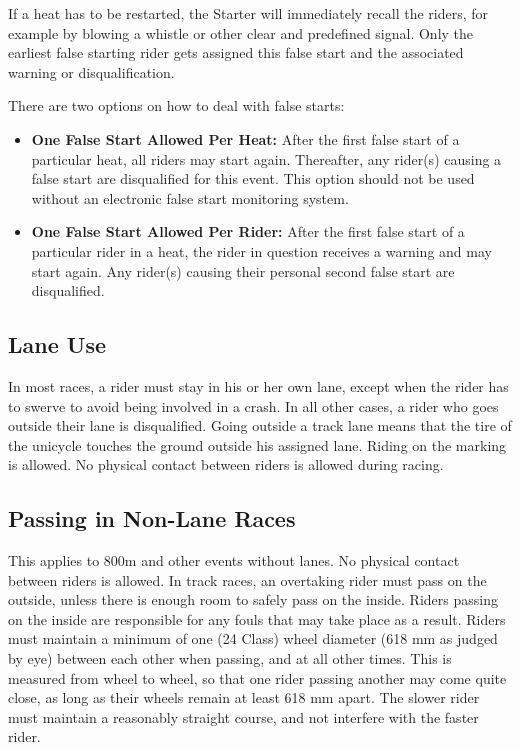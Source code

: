 If a heat has to be restarted, the Starter will immediately recall the riders, for example by blowing a whistle or other clear and predefined signal.
Only the earliest false starting rider gets assigned this false start and the associated warning or disqualification.

There are two options on how to deal with false starts:
\begin{itemize}

\item \textbf{One False Start Allowed Per Heat:}
After the first false start of a particular heat, all riders may start again.
Thereafter, any rider(s) causing a false start are disqualified for this event.
This option should not be used without an electronic false start monitoring system.
\item \textbf{One False Start Allowed Per Rider:}
After the first false start of a particular rider in a heat, the rider in question receives a warning and may start again.
Any rider(s) causing their personal second false start are disqualified.
\end{itemize}

\subsection{Lane Use}

In most races, a rider must stay in his or her own lane, except when the rider has to swerve to avoid being involved in a crash.
In all other cases, a rider who goes outside their lane is disqualified.
Going outside a track lane means that the tire of the unicycle touches the ground outside his assigned lane.
Riding on the marking is allowed.
No physical contact between riders is allowed during racing.

\subsection{Passing in Non-Lane Races \label{subsec:track-field_lane-use_non-lane-races}}

This applies to 800m and other events without lanes.
No physical contact between riders is allowed.
In track races, an overtaking rider must pass on the outside, unless there is enough room to safely pass on the inside.
Riders passing on the inside are responsible for any fouls that may take place as a result.
Riders must maintain a minimum of one (24 Class) wheel diameter (618 mm as judged by eye) between each other when passing, and at all other times.
This is measured from wheel to wheel, so that one rider passing another may come quite close, as long as their wheels remain at least 618 mm apart.
The slower rider must maintain a reasonably straight course, and not interfere with the faster rider.

